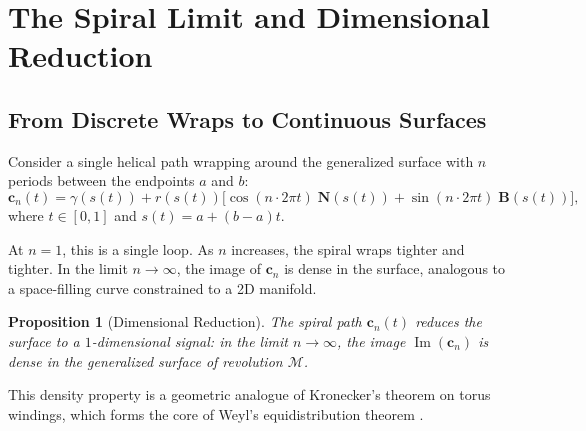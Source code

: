 \documentclass[11pt,twoside]{article}
\newtheorem{proposition}{Proposition}
\begin{document}
\section{The Spiral Limit and Dimensional Reduction}

\subsection{From Discrete Wraps to Continuous Surfaces}

Consider a single helical path wrapping around the generalized surface with $n$ periods between the endpoints $a$ and $b$:
\begin{equation}
	\mathbf{c}_n(t) = \gamma(s(t)) + r(s(t))\bigl[\cos(n \cdot 2\pi t) \; \mathbf{N}(s(t)) + \sin(n \cdot 2\pi t) \; \mathbf{B}(s(t))\bigr],
\end{equation}
where $t \in [0, 1]$ and $s(t) = a + (b - a)t$.

At $n = 1$, this is a single loop. As $n$ increases, the spiral wraps tighter and tighter. In the limit $n \to \infty$, the image of $\mathbf{c}_n$ is dense in the surface, analogous to a space-filling curve constrained to a 2D manifold.

\begin{proposition}[Dimensional Reduction]
	The spiral path $\mathbf{c}_n(t)$ reduces the surface to a $1$-dimensional signal: in the limit $n \to \infty$, the image $\operatorname{Im}(\mathbf{c}_n)$ is dense in the generalized surface of revolution $\mathcal{M}$.
\end{proposition}

This density property is a geometric analogue of Kronecker's theorem on torus windings, which forms the core of Weyl's equidistribution theorem \cite{Weyl}.
\end{document}
